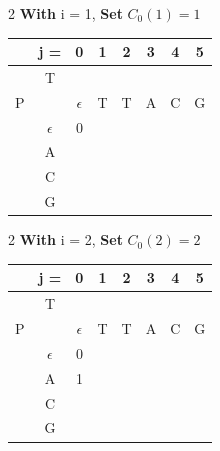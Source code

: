 \begin{multicols}{2}
    \textbf{With} i = 1, \textbf{Set} $C_0(1) = 1$

    \begin{center}
        \begin{tabular}{|c c|c|c|c|c|c|c|} \hline
        &   j =  &  0           &   1   &   2   &   3   &   4   &   5   \\ \hline
        &   T    &              &       &       &       &       &       \\
        P   &        &  $\epsilon$  &   T   &   T   &   A   &   C   &   G   \\ \hline
        & $\epsilon$ &   0      &       &       &       &       &       \\ \hline
        &    A   &       \ccr1       &       &       &       &       &       \\ \hline
        &    C   &              &       &       &       &       &       \\ \hline
        &    G   &              &       &       &       &       &       \\ \hline
        \end{tabular}
    \end{center}
\end{multicols}

\begin{multicols}{2}
    \textbf{With} i = 2, \textbf{Set} $C_0(2) = 2$

    \begin{center}
        \begin{tabular}{|c c|c|c|c|c|c|c|} \hline
        &   j =  &  0           &   1   &   2   &   3   &   4   &   5   \\ \hline
        &   T    &              &       &       &       &       &       \\
        P   &        &  $\epsilon$  &   T   &   T   &   A   &   C   &   G   \\ \hline
        & $\epsilon$ &   0      &       &       &       &       &       \\ \hline
        &    A   &      1       &       &       &       &       &       \\ \hline
        &    C   &     \ccr2         &       &       &       &       &       \\ \hline
        &    G   &              &       &       &       &       &       \\ \hline
        \end{tabular}
    \end{center}
\end{multicols}

